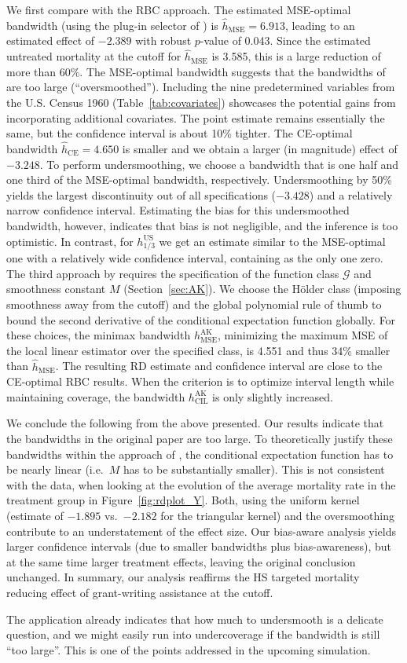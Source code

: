 We first compare with the RBC approach.
The estimated MSE-optimal bandwidth (using the plug-in selector of \cite{Calonico_2014}) is $\hat{h}_{\text{MSE}} = 6.913$,
leading to an estimated effect of $-2.389$ with robust $p$-value of 0.043.
Since the estimated untreated mortality at the cutoff for $\hat{h}_{\text{MSE}}$ is 3.585,
this is a large reduction of more than 60\%.
The MSE-optimal bandwidth suggests that the bandwidths of \citeauthor{Ludwig_2007} are too large (\enquote{oversmoothed}).
Including the nine predetermined variables from the U.S. Census 1960 (Table~\ref{tab:covariates})
showcases the potential gains from incorporating additional covariates.
The point estimate remains essentially the same, but the confidence interval is about 10\% tighter.
The CE-optimal bandwidth $\hat{h}_{\text{CE}} = 4.650$ is smaller and we obtain a larger (in magnitude) effect of $-3.248$.
To perform undersmoothing, we choose a bandwidth that is one half and one third of the MSE-optimal bandwidth, respectively.
Undersmoothing by 50\% yields the largest discontinuity out of all specifications ($-3.428$) and a relatively narrow confidence interval.
Estimating the bias for this undersmoothed bandwidth, however, indicates that bias is not negligible,
and the inference is too optimistic.
In contrast, for $h^{\text{US}}_{1/3}$ we get an estimate similar to the MSE-optimal one with a relatively wide confidence interval,
containing as the only one zero.
The third approach by \citeauthor{Armstrong_2020} requires the specification of the function class $\mathcal{G}$ and smoothness constant $M$ (Section~\ref{sec:AK}).
We choose the Hölder class (imposing smoothness away from the cutoff) and
the global polynomial rule of thumb to bound the second derivative of the conditional expectation function globally.
For these choices, the minimax bandwidth $h^{\text{AK}}_{\text{MSE}}$,
minimizing the maximum MSE of the local linear estimator over the specified class,
is 4.551 and thus 34\% smaller than $\hat{h}_{\text{MSE}}$.
The resulting RD estimate and confidence interval are close to the CE-optimal RBC results.
When the criterion is to optimize interval length while maintaining coverage, the bandwidth $h^{\text{AK}}_{\text{CIL}}$ is only slightly increased.

We conclude the following from the above presented.
Our results indicate that the bandwidths in the original paper are too large.
To theoretically justify these bandwidths within the approach of \citeauthor{Armstrong_2020},
the conditional expectation function has to be nearly linear (i.e.\ $M$ has to be substantially smaller).
This is not consistent with the data, when looking at the evolution of the average mortality rate in the treatment group in Figure~\ref{fig:rdplot_Y}.
Both, using the uniform kernel (estimate of $-1.895$ vs.\ $-2.182$ for the triangular kernel) and the oversmoothing
contribute to an understatement of the effect size.
Our bias-aware analysis yields larger confidence intervals (due to smaller bandwidths plus bias-awareness),
but at the same time larger treatment effects, leaving the original conclusion unchanged.
In summary, our analysis reaffirms the HS targeted mortality reducing effect of grant-writing assistance at the cutoff.

The application already indicates that how much to undersmooth is a delicate question,
and we might easily run into undercoverage if the bandwidth is still \enquote{too large}.
This is one of the points addressed in the upcoming simulation.  